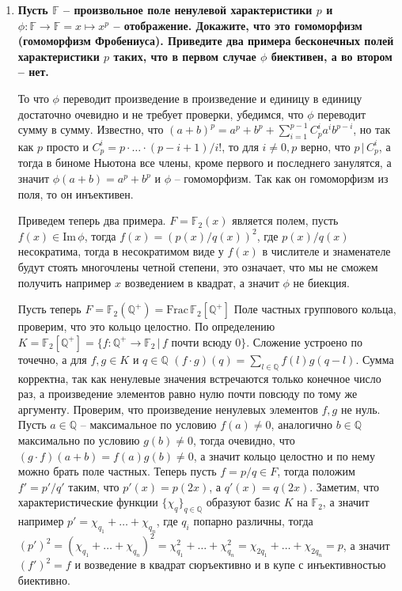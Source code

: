 \documentclass{article}
\begin{document}
\begin{enumerate}
    \item \textbf{Пусть $\mathbb{F}$ – произвольное поле ненулевой характеристики
        $p$ и $\phi:\mathbb{F}\rightarrow\mathbb{F}=x\mapsto x^p$ – отображение.
        Докажите, что это гомоморфизм (гомоморфизм Фробениуса). Приведите два
        примера бесконечных полей характеристики $p$ таких, что в первом случае
        $\phi$ биективен, а во втором – нет.}

        То что $\phi$ переводит произведение в произведение и единицу в единицу
        достаточно очевидно и не требует проверки, убедимся, что $\phi$ переводит
        сумму в сумму. Известно, что $(a+b)^p=a^p+b^p+\sum_{i=1}^{p-1}C_p^ia^ib^{p-i}$,
        но так как $p$ просто и  $C_p^i=p\cdot\ldots\cdot(p-i+1)/i!$, то для
        $i\neq0,p$ верно, что $p\,|\,C_p^i$, а тогда в биноме Ньютона все члены, 
        кроме первого и последнего занулятся, а значит $\phi(a+b)=a^p+b^p$ и
        $\phi$ – гомоморфизм. Так как он гомоморфизм из поля, то он инъективен.
        
        Приведем теперь два примера. $F=\mathbb{F}_2(x)$ является полем, пусть
        $f(x)\in\text{Im}\,\phi$, тогда $f(x)=(p(x)/q(x))^2$, где $p(x)/q(x)$
        несократима, тогда в несократимом виде у $f(x)$ в числителе и знаменателе
        будут стоять многочлены четной степени, это означает, что мы не сможем
        получить например $x$ возведением в квадрат, а значит $\phi$ не биекция.

        Пусть теперь $F=\mathbb{F}_2(\mathbb{Q}^+)=\text{Frac}\,\mathbb{F}_2[\mathbb{Q}^+]$
        Поле частных группового кольца, проверим, что это кольцо целостно. По
        определению $K=\mathbb{F}_2[\mathbb{Q}^+]=\{f:\mathbb{Q}^+\rightarrow
        \mathbb{F}_2\,|\,f\text{ почти всюду 0}\}$. Сложение устроено по
        точечно, а для $f,g\in K$ и $q\in\mathbb{Q}$ $(f\cdot g)(q)=
        \sum_{l\in\mathbb{Q}}f(l)g(q-l)$. Сумма корректна, так как ненулевые
        значения встречаются только конечное число раз, а произведение элементов
        равно нулю почти повсюду по тому же аргументу. Проверим, что
        произведение ненулевых элементов $f,g$ не нуль. Пусть $a\in\mathbb{Q}$ –
        максимальное по условию $f(a)\neq 0$, аналогично $b\in\mathbb{Q}$
        максимально по условию $g(b)\neq 0$, тогда очевидно, что $(g\cdot f)(a+b)
        =f(a)g(b)\neq 0$, а значит кольцо целостно и по нему можно брать поле
        частных. Теперь пусть $f=p/q\in F$, тогда положим $f'=p'/q'$ таким, что
        $p'(x)=p(2x)$, а $q'(x)=q(2x)$. Заметим, что характеристические функции
        $\{\chi_q\}_{q\in\mathbb{Q}}$
        образуют базис $K$ на $\mathbb{F}_2$, а значит например $p'=\chi_{q_1}
        +\ldots+\chi_{q_n}$, где $q_i$ попарно различны, тогда $(p')^2=(\chi_{q_1}
        +\ldots+\chi_{q_n})^2=\chi_{q_1}^2+\ldots+\chi_{q_n}^2=\chi_{2q_1}+\ldots
        +\chi_{2q_n}=p$, а значит $(f')^2=f$ и возведение в квадрат сюръективно
        и в купе с инъективностью биективно.
\end{enumerate}
\end{document}
